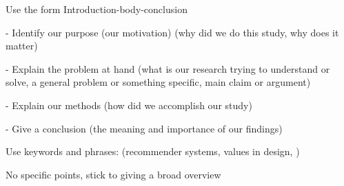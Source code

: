

Use the form Introduction-body-conclusion





- Identify our purpose (our motivation) (why did we do this study, why does it matter)



- Explain the problem at hand (what is our research trying to understand or solve, a general problem or something specific, main claim or argument)



- Explain our methods (how did we accomplish our study)



- Give a conclusion (the meaning and importance of our findings)





Use keywords and phrases: (recommender systems, values in design, )

No specific points, stick to giving a broad overview

